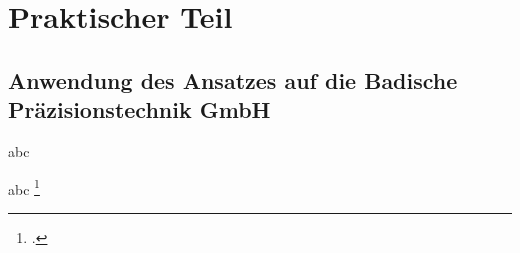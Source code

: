 \chapter{Praktischer Teil}


\section{Anwendung des Ansatzes auf die Badische Präzisionstechnik GmbH}

abc


abc \footcite[Vgl.][]{sap_business-workflows_2022-1}

